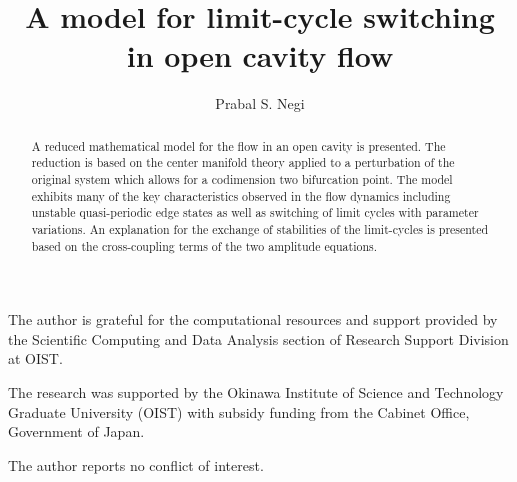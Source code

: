 \documentclass[lineno]{JFM-FLM_Au}
\title{A model for limit-cycle switching in open cavity flow}
\author{Prabal S. Negi}
\affiliation{Okinawa Institute of Science and Technology Graduate University, Onna, Okinawa 904-0495, Japan}
\begin{document}
\maketitle

\begin{abstract}
	A reduced mathematical model for the flow in an open cavity is presented. The reduction is based on the center manifold theory applied to a perturbation of the original system which allows for a codimension two bifurcation point. The model exhibits many of the key characteristics observed in the flow dynamics including unstable quasi-periodic edge states as well as switching of limit cycles with parameter variations. An explanation for the exchange of stabilities of the limit-cycles is presented based on the cross-coupling terms of the two amplitude equations.
\end{abstract}

\begin{keywords}
\end{keywords}


% 
% 

\FloatBarrier

%
%

\begin{bmhead}[Acknowledgements.]
	The author is grateful for the computational resources and support provided by the Scientific Computing and Data Analysis section of Research Support Division at OIST.
\end{bmhead}
	
\begin{bmhead}[Funding.]
The research was supported by the Okinawa Institute of Science and Technology Graduate	University (OIST) with subsidy funding from the Cabinet Office, Government of Japan.
\end{bmhead}

\begin{bmhead}
	The author reports no conflict of interest.
\end{bmhead}










\end{document}
